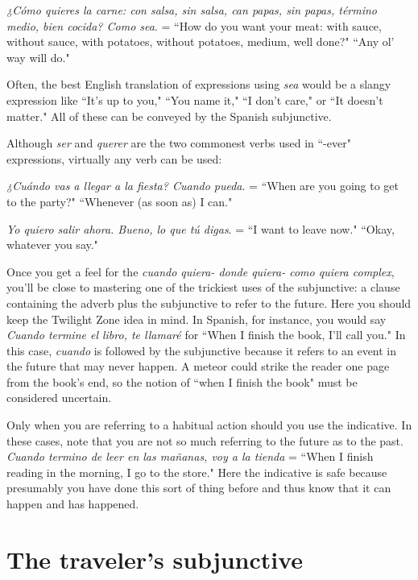 \indu \emph{¿Cómo quieres la carne: con salsa, sin salsa, can papas, sin
	papas, término medio, bien cocida? Como sea}. =
``How do you want your meat: with sauce, without
sauce, with potatoes, without potatoes, medium, well
done?" ``Any ol' way will do."

\bsk

Often, the best English translation of expressions using \emph{sea}
would be a slangy expression like ``It's up to you," ``You name it," ``I
don't care," or ``It doesn't matter." All of these can be conveyed by the
Spanish subjunctive.

Although \emph{ser} and \emph{querer} are the two commonest verbs used in
``-ever" expressions, virtually any verb can be used:

\bsk

\indu \emph{¿Cuándo vas a llegar a la fiesta? Cuando pueda}. = ``When are
you going to get to the party?" ``Whenever (as soon as)
I can."

\indu \emph{Yo quiero salir ahora. Bueno, lo que tú digas}. = ``I want to
leave now." ``Okay, whatever you say."

\bsk

Once you get a feel for the \emph{cuando quiera- donde quiera- como quiera complex}, you'll be close to mastering one of the trickiest uses of the subjunctive: a clause containing the adverb plus the
subjunctive to refer to the future. Here you should keep the Twilight
Zone idea in mind. In Spanish, for instance, you would say \emph{Cuando
	termine el libro, te llamaré} for ``When I finish the book, I'll call you."
In this case, \emph{cuando} is followed by the subjunctive because it refers to
an event in the future that may never happen. A meteor could strike
the reader one page from the book's end, so the notion of ``when I finish the book" must be considered uncertain.

Only when you are referring to a habitual action should you
use the indicative. In these cases, note that you are not so much referring to the future as to the past. \emph{Cuando termino de leer en las mañanas, voy a la tienda} = ``When I finish reading in the morning, I go
to the store." Here the indicative is safe because presumably you have
done this sort of thing before and thus know that it can happen and has
happened.

\section{The traveler's subjunctive}


